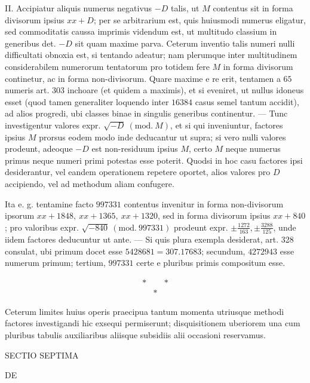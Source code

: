 II. Accipiatur aliquis numerus negativus \(-D\) talis, ut \(M\) contentus sit in forma divisorum ipsius \(xx+D\); per se arbitrarium est, quis huiusmodi numerus eligatur, sed commoditatis caussa imprimis videndum est, ut multitudo classium in generibus det. \(-D\) sit quam maxime parva. Ceterum inventio talis numeri nulli difficultati obnoxia est, si tentando adeatur; nam plerumque inter multitudinem considerabilem numerorum tentatorum pro totidem fere \(M\) in forma divisorum continetur, ac in forma non-divisorum. Quare maxime e re erit, tentamen a \(65\) numeris art. 303 inchoare (et quidem a maximis), et si eveniret, ut nullus idoneus esset (quod tamen generaliter loquendo inter \(16384\) casus semel tantum accidit), ad alios progredi, ubi classes binae in singulis generibus continentur. — Tunc investigentur valores expr. \(\surd{-D}\ (\mathrm{mod.}\ M)\), et si qui inveniuntur, factores ipsius \(M\) prorsus eodem modo inde deducantur ut supra; si vero nulli valores prodeunt, adeoque \(-D\) est non-residuum ipsius \(M\), certo \(M\) neque numerus primus neque numeri primi potestas esse poterit. Quodsi in hoc
casu factores ipsi desiderantur, vel eandem operationem repetere oportet, alios valores pro \(D\) accipiendo, vel ad methodum aliam confugere.

Ita e. g. tentamine facto \(997331\) contentus invenitur in forma non-divisorum ipsorum \(xx+1848,\allowbreak \ xx+1365,\allowbreak \ xx+1320\), sed in forma divisorum ipsius \(xx+840\); pro valoribus expr. \(\surd{-840}\ (\mathrm{mod.}\ 997331)\) prodeunt expr. \(\pm\frac{1272}{163},\allowbreak \pm\frac{3288}{125}\), unde iidem factores deducuntur ut ante. — Si quis plura exempla desiderat, art. 328 consulat, ubi primum docet esse \(5428681=307.17683\); secundum, \(4272943\) esse numerum primum; tertium, \(997331\) certe e pluribus primis compositum esse.

\[\begin{array}{ccc}*& &*\\ &*&\end{array}\]

Ceterum limites huius operis praecipua tantum momenta utriusque methodi factores investigandi hic exsequi permiserunt; disquisitionem uberiorem una cum pluribus tabulis auxiliaribus aliisque subsidiis alii occasioni reservamus.
\clearpage
{}


\begin{center}{\Large SECTIO SEPTIMA}\par\medskip DE\par{}\end{center}

